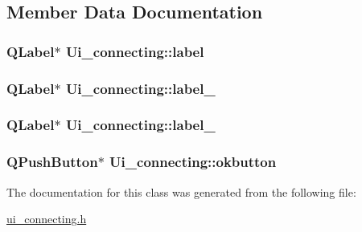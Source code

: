 \subsection{Member Data Documentation}
\hypertarget{classUi__connecting_a25138abdfe64a738d1a24907023b569c}{
\subsubsection[{label}]{\setlength{\rightskip}{0pt plus 5cm}Q\-Label$\ast$ Ui\-\_\-connecting\-::label}}\label{classUi__connecting_a25138abdfe64a738d1a24907023b569c}
\hypertarget{classUi__connecting_a203737b79762fe667676a0745336b09e}{
\subsubsection[{label\-\_\-2}]{\setlength{\rightskip}{0pt plus 5cm}Q\-Label$\ast$ Ui\-\_\-connecting\-::label\-\_}}\label{classUi__connecting_a203737b79762fe667676a0745336b09e}
\hypertarget{classUi__connecting_ae3bcba707b34e2dbd957969134b5f7b7}{
\subsubsection[{label\-\_\-3}]{\setlength{\rightskip}{0pt plus 5cm}Q\-Label$\ast$ Ui\-\_\-connecting\-::label\-\_}}\label{classUi__connecting_ae3bcba707b34e2dbd957969134b5f7b7}
\hypertarget{classUi__connecting_ab2e712d5e187d9f429caaa1353f74ffd}{
\subsubsection[{okbutton}]{\setlength{\rightskip}{0pt plus 5cm}Q\-Push\-Button$\ast$ Ui\-\_\-connecting\-::okbutton}}\label{classUi__connecting_ab2e712d5e187d9f429caaa1353f74ffd}


The documentation for this class was generated from the following file\-:\begin{DoxyCompactItemize}
\item 
\hyperlink{ui__connecting_8h}{ui\-\_\-connecting.\-h}\end{DoxyCompactItemize}
